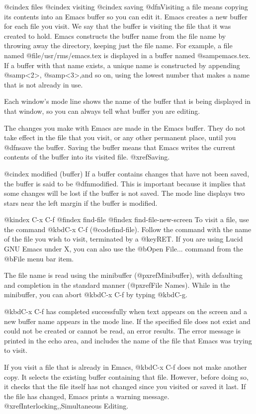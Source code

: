 {{{{{{{{{{{{{{{{@cindex files
@cindex visiting
@cindex saving
  @dfn{Visiting} a file means copying its contents into an Emacs buffer
so you can edit it.  Emacs creates a new buffer for each file you
visit.  We say that the buffer is visiting the file that it was created
to hold.  Emacs constructs the buffer name from the file name by
throwing away the directory, keeping just the file name.  For example,
a file named @file{/usr/rms/emacs.tex} is displayed in a buffer named
@samp{emacs.tex}.  If a buffer with that name exists, a unique
name is constructed by appending @samp{<2>}, @samp{<3>},and so on, using
the lowest number that makes a name that is not already in use.

  Each window's mode line shows the name of the buffer that is being displayed
in that window, so you can always tell what buffer you are editing.

  The changes you make with Emacs are made in the Emacs buffer.  They do
not take effect in the file that you visit, or any other permanent
place, until you @dfn{save} the buffer.  Saving the buffer means that
Emacs writes the current contents of the buffer into its visited file.
@xref{Saving}.

@cindex modified (buffer)
  If a buffer contains changes that have not been saved, the buffer is said
to be @dfn{modified}.  This is important because it implies that some
changes will be lost if the buffer is not saved.  The mode line displays
two stars near the left margin if the buffer is modified.

@kindex C-x C-f
@findex find-file
@findex find-file-new-screen
  To visit a file, use the command @kbd{C-x C-f} (@code{find-file}).  Follow
the command with the name of the file you wish to visit, terminated by a
@key{RET}.  If you are using Lucid GNU Emacs under X, you can also use the
@b{Open File...} command from the @b{File} menu bar item. 

  The file name is read using the minibuffer (@pxref{Minibuffer}), with
defaulting and completion in the standard manner (@pxref{File Names}).
While in the minibuffer, you can abort @kbd{C-x C-f} by typing @kbd{C-g}.

  @kbd{C-x C-f} has completed successfully when text appears on the
screen and a new buffer name appears in the mode line.  If the specified
file does not exist and could not be created or cannot be read, an error
results.  The error message is printed in the echo area, and includes
the name of the file that Emacs was trying to visit.

  If you visit a file that is already in Emacs, @kbd{C-x C-f} does not make
another copy.  It selects the existing buffer containing that file.
However, before doing so, it checks that the file itself has not changed
since you visited or saved it last.  If the file has changed, Emacs
prints a warning message.  @xref{Interlocking,,Simultaneous Editing}.

}}}}}}}}}}}}}}}}
